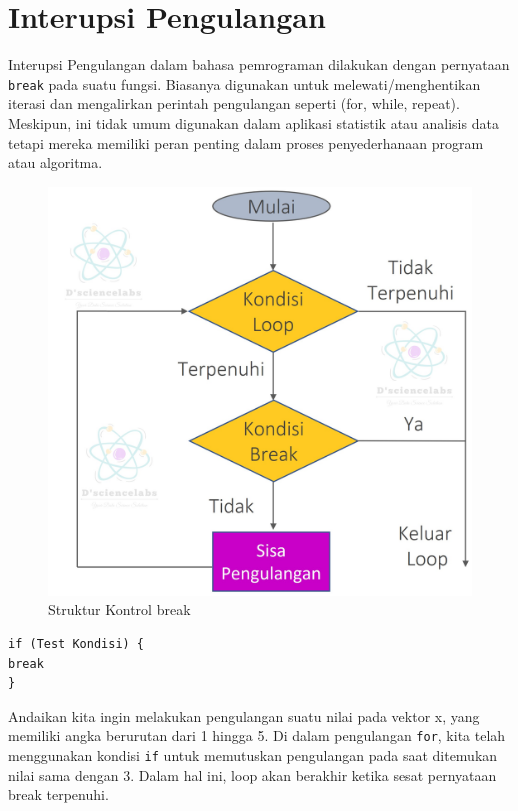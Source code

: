 \documentclass[
]{book}
\begin{document}
\hypertarget{interupsi-pengulangan}{%
\section{Interupsi Pengulangan}\label{interupsi-pengulangan}}

Interupsi Pengulangan dalam bahasa pemrograman dilakukan dengan pernyataan \texttt{break} pada suatu fungsi. Biasanya digunakan untuk melewati/menghentikan iterasi dan mengalirkan perintah pengulangan seperti (for, while, repeat). Meskipun, ini tidak umum digunakan dalam aplikasi statistik atau analisis data tetapi mereka memiliki peran penting dalam proses penyederhanaan program atau algoritma.

\begin{figure}

{\centering \includegraphics[width=1\linewidth]{./images/Bab6/break} 

}

\caption{Struktur Kontrol break}\label{fig:break}
\end{figure}

\begin{verbatim}
if (Test Kondisi) {
break
}
\end{verbatim}

Andaikan kita ingin melakukan pengulangan suatu nilai pada vektor x, yang memiliki angka berurutan dari 1 hingga 5. Di dalam pengulangan \texttt{for}, kita telah menggunakan kondisi \texttt{if} untuk memutuskan pengulangan pada saat ditemukan nilai sama dengan 3. Dalam hal ini, loop akan berakhir ketika sesat pernyataan break terpenuhi.
\end{document}
